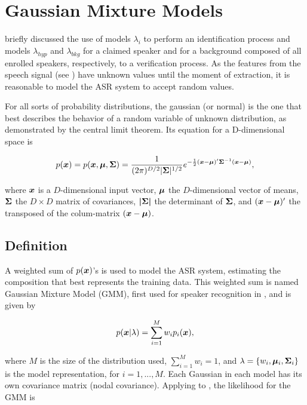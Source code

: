 \chapter{Gaussian Mixture Models}
\label{ch:gmm}

 briefly discussed the use of models $\lambda_i$ to perform an identification process and models $\lambda_{hyp}$ and $\lambda_{bkg}$ for a claimed speaker and for a background composed of all enrolled speakers, respectively, to a verification process. As the features from the speech signal (see ) have unknown values until the moment of extraction, it is reasonable to model the ASR system to accept random values.

For all sorts of probability distributions, the gaussian (or normal) is the one that best describes the behavior of a random variable of unknown distribution, as demonstrated by the central limit theorem. Its equation for a D-dimensional space is

\begin{equation}
    \pdf{\dvec{x}} = p(\dvec{x},\dvec{\mu},\dvec{\Sigma}) = \dgaussian{x}{\mu}{\Sigma},
    \label{eq:gaussian}
\end{equation}

\noindent where $\boldsymbol{x}$ is a $D$-dimensional input vector, $\boldsymbol{\mu}$ the $D$-dimensional vector of means, $\boldsymbol{\Sigma}$ the $D \times D$ matrix of covariances, $\boldsymbol{|\Sigma|}$ the determinant of $\boldsymbol{\Sigma}$, and $(\boldsymbol{x} - \boldsymbol{\mu})'$ the transposed of the colum-matrix $(\boldsymbol{x} - \boldsymbol{\mu})$.

\section{Definition}
\label{sec:gmm-definition}

A weighted sum of $p(\boldsymbol{x})$'s is used to model the ASR system, estimating the composition that best represents the training data. This weighted sum is named Gaussian Mixture Model (GMM), first used for speaker recognition in , and is given by

\begin{equation}
    \postpdf{\dvec{x}}{\lambda} = \sum_{i=1}^M w_i\pdfi{\dvec{x}},
    \label{eq:gaussian_mixture}
\end{equation}

\noindent where $M$ is the size of the distribution used, $\sum_{i=1}^M w_i = 1$, and $\lambda = \{w_i, \boldsymbol{\mu}_i, \boldsymbol{\Sigma}_i\}$ is the model representation, for $i = 1, ..., M$. Each Gaussian in each model has its own covariance matrix (nodal covariance). Applying  to , the likelihood for the GMM is


